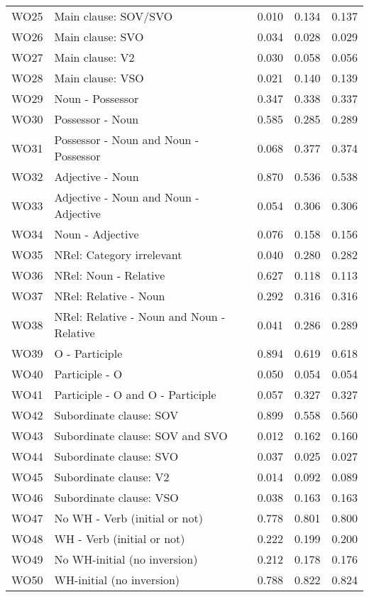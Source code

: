 \begin{longtable}{lllll}
WO25 & Main clause: SOV/SVO & 0.010 & 0.134 & 0.137\\
WO26 & Main clause: SVO & 0.034 & 0.028 & 0.029\\
WO27 & Main clause: V2 & 0.030 & 0.058 & 0.056\\
WO28 & Main clause: VSO & 0.021 & 0.140 & 0.139\\
WO29 & Noun - Possessor & 0.347 & 0.338 & 0.337\\
WO30 & Possessor - Noun & 0.585 & 0.285 & 0.289\\
WO31 & Possessor - Noun and Noun - Possessor & 0.068 & 0.377 & 0.374\\
WO32 & Adjective - Noun & 0.870 & 0.536 & 0.538\\
WO33 & Adjective - Noun and Noun - Adjective & 0.054 & 0.306 & 0.306\\
WO34 & Noun - Adjective & 0.076 & 0.158 & 0.156\\
WO35 & NRel: Category irrelevant & 0.040 & 0.280 & 0.282\\
WO36 & NRel: Noun - Relative & 0.627 & 0.118 & 0.113\\
WO37 & NRel: Relative - Noun & 0.292 & 0.316 & 0.316\\
WO38 & NRel: Relative - Noun and Noun - Relative & 0.041 & 0.286 & 0.289\\
WO39 & O - Participle & 0.894 & 0.619 & 0.618\\
WO40 & Participle - O & 0.050 & 0.054 & 0.054\\
WO41 & Participle - O and O - Participle & 0.057 & 0.327 & 0.327\\
WO42 & Subordinate clause: SOV & 0.899 & 0.558 & 0.560\\
WO43 & Subordinate clause: SOV and SVO & 0.012 & 0.162 & 0.160\\
WO44 & Subordinate clause: SVO & 0.037 & 0.025 & 0.027\\
WO45 & Subordinate clause: V2 & 0.014 & 0.092 & 0.089\\
WO46 & Subordinate clause: VSO & 0.038 & 0.163 & 0.163\\
WO47 & No WH - Verb (initial or not) & 0.778 & 0.801 & 0.800\\
WO48 & WH - Verb (initial or not) & 0.222 & 0.199 & 0.200\\
WO49 & No WH-initial (no inversion) & 0.212 & 0.178 & 0.176\\
WO50 & WH-initial (no inversion) & 0.788 & 0.822 & 0.824\\
\bottomrule
\end{longtable}